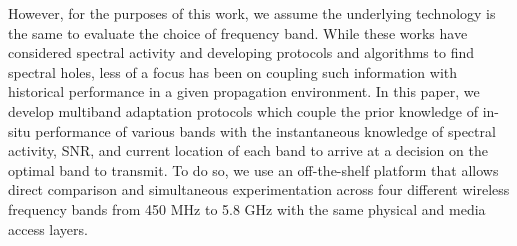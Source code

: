However, for the purposes of this work, we assume the underlying technology is the same to evaluate the choice of frequency band.
While these works have considered spectral activity and developing protocols and algorithms to 
find spectral holes, less of a focus has been on coupling such information with historical performance in a given 
propagation environment.
In this paper, 
we develop multiband adaptation protocols which couple the prior knowledge of in-situ performance of various bands with the instantaneous knowledge of 
spectral activity, SNR, and current location of each band to arrive at a decision on the optimal band to transmit. To do so, we use an
off-the-shelf platform that allows direct comparison and simultaneous experimentation across four different wireless
frequency bands from 450 MHz to 5.8 GHz with the same physical
and media access layers. 

